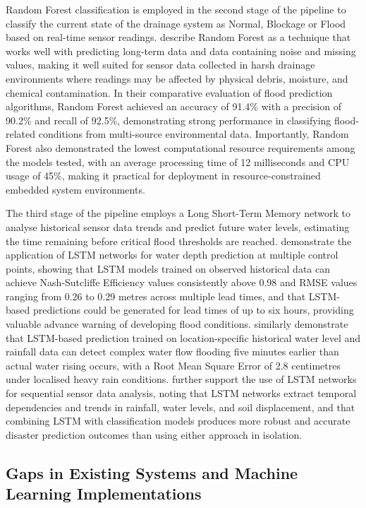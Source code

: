 \documentclass[12pt, a4paper]{article}
\begin{document}
Random Forest classification is employed in the second stage of the pipeline to classify the current state of the drainage system as Normal, Blockage or Flood based on real-time sensor readings. \citet{sathiyamoorthy2025} describe Random Forest as a technique that works well with predicting long-term data and data containing noise and missing values, making it well suited for sensor data collected in harsh drainage environments where readings may be affected by physical debris, moisture, and chemical contamination. In their comparative evaluation of flood prediction algorithms, Random Forest achieved an accuracy of 91.4\% with a precision of 90.2\% and recall of 92.5\%, demonstrating strong performance in classifying flood-related conditions from multi-source environmental data. Importantly, Random Forest also demonstrated the lowest computational resource requirements among the models tested, with an average processing time of 12 milliseconds and CPU usage of 45\%, making it practical for deployment in resource-constrained embedded system environments.

The third stage of the pipeline employs a Long Short-Term Memory network to analyse historical sensor data trends and predict future water levels, estimating the time remaining before critical flood thresholds are reached. \citet{bao2025} demonstrate the application of LSTM networks for water depth prediction at multiple control points, showing that LSTM models trained on observed historical data can achieve Nash-Sutcliffe Efficiency values consistently above 0.98 and RMSE values ranging from 0.26 to 0.29 metres across multiple lead times, and that LSTM-based predictions could be generated for lead times of up to six hours, providing valuable advance warning of developing flood conditions. \citet{hiroi2016} similarly demonstrate that LSTM-based prediction trained on location-specific historical water level and rainfall data can detect complex water flow flooding five minutes earlier than actual water rising occurs, with a Root Mean Square Error of 2.8 centimetres under localised heavy rain conditions. \citet{banupriya2025} further support the use of LSTM networks for sequential sensor data analysis, noting that LSTM networks extract temporal dependencies and trends in rainfall, water levels, and soil displacement, and that combining LSTM with classification models produces more robust and accurate disaster prediction outcomes than using either approach in isolation.

\clearpage
\subsection{Gaps in Existing Systems and Machine Learning Implementations}
\end{document}
